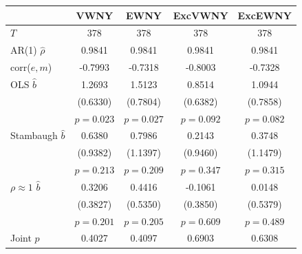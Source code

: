 \begin{tabular}{lcccc}
\toprule
 & VWNY & EWNY & ExcVWNY & ExcEWNY \\
\midrule
$T$ & 378 & 378 & 378 & 378 \\
AR(1) $\hat\rho$ & 0.9841 & 0.9841 & 0.9841 & 0.9841 \\
corr($e,m$) & -0.7993 & -0.7318 & -0.8003 & -0.7328 \\
\midrule
OLS $\hat b$ & 1.2693 & 1.5123 & 0.8514 & 1.0944 \\
 & (0.6330) & (0.7804) & (0.6382) & (0.7858) \\
 & $p=0.023$ & $p=0.027$ & $p=0.092$ & $p=0.082$ \\
Stambaugh $\hat b$ & 0.6380 & 0.7986 & 0.2143 & 0.3748 \\
 & (0.9382) & (1.1397) & (0.9460) & (1.1479) \\
 & $p=0.213$ & $p=0.209$ & $p=0.347$ & $p=0.315$ \\
$\rho\approx1$ $\hat b$ & 0.3206 & 0.4416 & -0.1061 & 0.0148 \\
 & (0.3827) & (0.5350) & (0.3850) & (0.5379) \\
 & $p=0.201$ & $p=0.205$ & $p=0.609$ & $p=0.489$ \\
\midrule
Joint $p$ & 0.4027 & 0.4097 & 0.6903 & 0.6308 \\
\bottomrule
\end{tabular}
